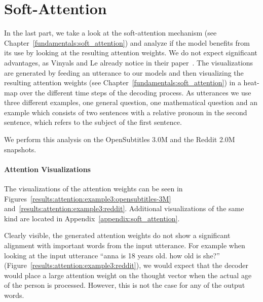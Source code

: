 \section{Soft-Attention}
\label{results:soft_attention}
In the last part, we take a look at the soft-attention mechanism (see Chapter~\ref{fundamentals:soft_attention}) and analyze if the model benefits from its use by looking at the resulting attention weights. We do not expect significant advantages, as Vinyals and Le already notice in their paper~\cite{Vinyals:2015}. The visualizations are generated by feeding an utterance to our models and then visualizing the resulting attention weights (see Chapter~\ref{fundamentals:soft_attention}) in a heat-map over the different time steps of the decoding process. As utterances we use three different examples, one general question, one mathematical question and an example which consists of two sentences with a relative pronoun in the second sentence, which refers to the subject of the first sentence.

We perform this analysis on the OpenSubtitles 3.0M and the Reddit 2.0M snapshots.

\paragraph{Attention Visualizations} The visualizations of the attention weights can be seen in Figures~\ref{results:attention:example3:opensubtitles-3M} and~\ref{results:attention:example3:reddit}. Additional visualizations of the same kind are located in Appendix~\ref{appendix:soft_attention}.

Clearly visible, the generated attention weights do not show a significant alignment with important words from the input utterance. For example when looking at the input utterance ``anna is 18 years old. how old is she?'' (Figure~\ref{results:attention:example3:reddit}), we would expect that the decoder would place a large attention weight on the thought vector when the actual age of the person is processed. However, this is not the case for any of the output words.

